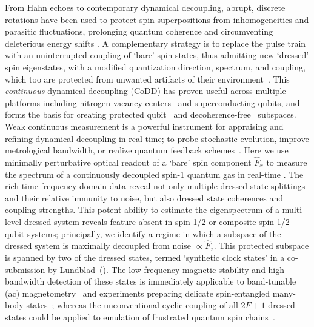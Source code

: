 \documentclass[aps,prl,reprint,superscriptaddress,floatfix]{revtex4-1}
\begin{document}
From Hahn echoes to contemporary dynamical decoupling, abrupt, discrete rotations have been used to protect spin superpositions from inhomogeneities and parasitic fluctuations, prolonging quantum coherence and circumventing deleterious energy shifts .
A complementary strategy is to replace the pulse train with an uninterrupted coupling of `bare' spin states, thus admitting new `dressed' spin eigenstates, with a modified quantization direction, spectrum, and coupling, which too are protected from unwanted artifacts of their environment~\cite{fanchini_continuously_2007}.
This \textit{continuous} dynamical decoupling (CoDD) has proven useful across multiple platforms including nitrogen-vacancy centers~\cite{hirose_continuous_2012,loretz_radio-frequency_2013,cai_robust_2012,*cai_long-lived_2012,golter_protecting_2014} and superconducting qubits, and forms the basis for creating protected qubit~\cite{aharon_general_2013} and decoherence-free~\cite{facchi_quantum_2002,*facchi_unification_2004} subspaces.
Weak continuous measurement is a powerful instrument for appraising and refining dynamical decoupling in real time; to probe stochastic evolution, improve metrological bandwidth, or realize quantum feedback schemes~\cite{vijay_stabilizing_2012}.
Here we use minimally perturbative  optical readout of a `bare' spin component $\hat{F}_x$ to measure the spectrum of a continuously decoupled spin-1 quantum gas in real-time .
The rich time-frequency domain data reveal not only multiple dressed-state splittings and their relative immunity to noise, but also dressed state coherences and coupling strengths.
This potent ability to estimate the eigenspectrum of a multi-level dressed system reveals feature absent in spin-1/2 or composite spin-1/2 qubit systems; principally, we identify a regime in which a subspace of the dressed system is maximally decoupled from noise $\propto \hat{F}_z$.
This protected  subspace is spanned by two of the dressed states, termed `synthetic clock states' in a co-submission by Lundblad~\etal (\lundblad).
The low-frequency magnetic stability and high-bandwidth detection of these states is immediately applicable to band-tunable (ac) magnetometry~\cite{hirose_continuous_2012,loretz_radio-frequency_2013,ockeloen_quantum_2013,*horsley_frequency-tunable_2016} and experiments preparing delicate spin-entangled many-body states~\cite{stamper-kurn_spinor_2013}; whereas the unconventional cyclic coupling of all $2F+1$ dressed states could be applied to emulation of frustrated quantum spin chains~\cite{mikeska_one-dimensional_2004}.
\end{document}
